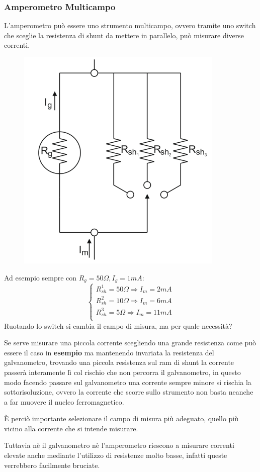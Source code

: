 \documentclass[a4paper, 15pt]{article}
\begin{document}
\subsubsection{Amperometro Multicampo}	
\begin{adjustwidth}{2in}{}
		L'amperometro può essere uno strumento multicampo, ovvero tramite uno switch che sceglie la resistenza di shunt da mettere in parallelo, può misurare diverse correnti.
\begin{figure}[H]
	\centering
	\includegraphics[width=0.3\linewidth]{fig/screenshot003}
	\label{fig:screenshot003}
\end{figure}
		Ad esempio sempre con $R_g= 50\Omega, I_g = 1mA$:
		\[\begin{cases}
			R_{sh}^1=50\Omega \Rightarrow I_m = 2mA \\
			R_{sh}^2=10\Omega \Rightarrow I_m = 6mA \\
			R_{sh}^3=5\Omega \Rightarrow I_m = 11mA \\
		\end{cases}\]
		Ruotando lo switch si cambia il campo di misura, ma per quale necessità? 
		
		Se serve misurare una piccola corrente scegliendo una grande resistenza come può essere il caso in \textbf{esempio} ma mantenendo invariata la resistenza del galvanometro, trovando una piccola resistenza sul ram di shunt la corrente passerà interamente lì col rischio che non percorra il galvanometro, in questo modo facendo passare sul galvanometro una corrente sempre minore si rischia la sottorisoluzione, ovvero la corrente che scorre sullo strumento non basta neanche a far muovere il nucleo ferromagnetico. 
		
		È perciò importante selezionare il campo di misura più adeguato, quello più vicino alla corrente che si intende misurare. \newline 
		
		Tuttavia nè il galvanometro nè l'amperometro riescono a misurare correnti elevate anche mediante l'utilizzo di resistenze molto basse, infatti queste verrebbero facilmente  bruciate.  
\end{adjustwidth}
\newpage		
\end{document}
